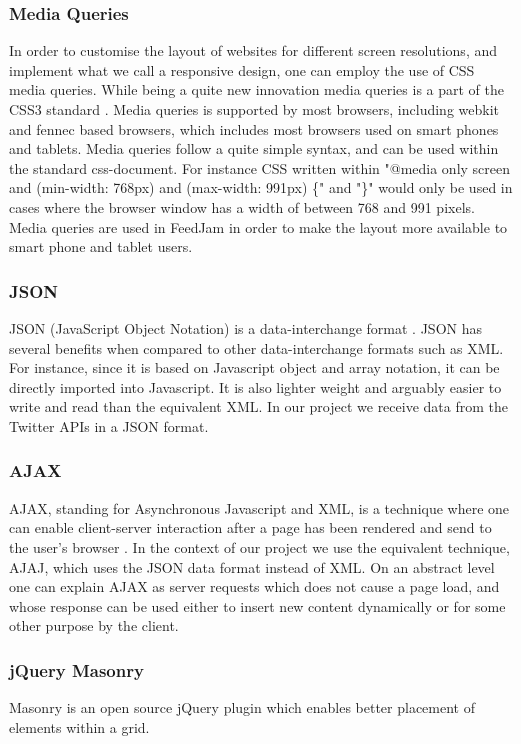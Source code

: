 \subsubsection{Media Queries} %
In order to customise the layout of websites for different screen resolutions, and implement what we call a responsive design, one can employ the use of CSS media queries. While being a quite new innovation media queries is a part of the CSS3 standard \cite{W3C}. Media queries is supported by most browsers, including webkit and fennec based browsers, which includes most browsers used on smart phones and tablets. Media queries follow a quite simple syntax, and can be used within the standard css-document. For instance CSS written within "@media only screen and (min-width: 768px) and (max-width: 991px) \{" and "\}" would only be used in cases where the browser window has a width of between 768 and 991 pixels. Media queries are used in FeedJam in order to make the layout more available to smart phone and tablet users.

\subsubsection{JSON}
JSON (JavaScript Object Notation) is a data-interchange format \cite{Crockford2011}. JSON has several benefits when compared to other data-interchange formats such as XML. For instance, since it is based on Javascript object and array notation, it can be directly imported into Javascript. It is also lighter weight and arguably easier to write and read than the equivalent XML. In our project we receive data from the Twitter APIs in a JSON format.

\subsubsection{AJAX}%
AJAX, standing for Asynchronous Javascript and XML, is a technique where one can enable client-server interaction after a page has been rendered and send to the user's browser \cite{Garrett2005}. In the context of our project we use the equivalent technique, AJAJ, which uses the JSON data format instead of XML. On an abstract level one can explain AJAX as server requests which does not cause a page load, and whose response can be used either to insert new content dynamically or for some other purpose by the client.

\subsubsection{jQuery Masonry}
Masonry is an open source jQuery plugin which enables better placement of elements within a grid.

